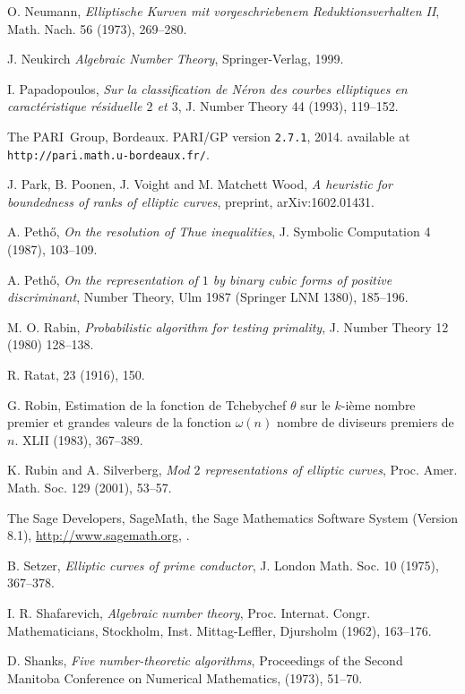 \begin{thebibliography}{}
O. Neumann,
\emph{Elliptische Kurven mit vorgeschriebenem Reduktionsverhalten II},
Math. Nach. 56 (1973), 269--280.

J. Neukirch
\emph{Algebraic Number Theory},
Springer-Verlag, 1999.

I. Papadopoulos,
\emph{Sur la classification de N\'eron des courbes elliptiques  
en caract\'eristique r\'esiduelle $2$ et $3$}, 
J. Number Theory 44 (1993), 119--152.

The PARI~Group, Bordeaux.
PARI/GP version {\tt 2.7.1}, 2014.
available at {\tt http://pari.math.u-bordeaux.fr/}.

J. Park, B. Poonen, J. Voight and M. Matchett Wood,
\emph{A heuristic for boundedness of ranks of elliptic curves},
preprint, arXiv:1602.01431.

A. Peth\H{o},
\emph{On the resolution of Thue inequalities},
J. Symbolic Computation 4 (1987), 103--109.

A. Peth\H{o},
\emph{On the representation of $1$ by binary cubic forms of positive discriminant},
Number Theory, Ulm 1987 (Springer LNM 1380), 185--196.

M. O. Rabin, 
 \emph{Probabilistic algorithm for testing primality}, J.
Number Theory 12 (1980) 128--138.

R. Ratat,
 23 (1916), 150.

G. Robin,
\newblock Estimation de la fonction de Tchebychef $\theta$ sur le $k$-i\`eme nombre premier et grandes valeurs de la fonction $\omega (n)$ nombre de diviseurs premiers de $n$.
 XLII (1983), 367--389.

K. Rubin and A. Silverberg,
\emph{Mod $2$ representations of elliptic curves}, Proc. Amer. Math. Soc. 129 (2001), 53--57.

The Sage Developers,
\newblock SageMath, the Sage Mathematics Software System (Version 8.1),
 \newblock \url{http://www.sagemath.org},
.

B. Setzer,
\emph{Elliptic curves of prime conductor},
J. London Math. Soc. 10 (1975), 367--378.

I. R. Shafarevich,
\emph{Algebraic number theory}, Proc. Internat. Congr. Mathematicians,
Stockholm, Inst. Mittag-Leffler, Djursholm (1962), 163--176.

D. Shanks,
\emph{Five number-theoretic algorithms},
 Proceedings of the Second Manitoba Conference on Numerical Mathematics, (1973), 51--70.


\end{thebibliography}
